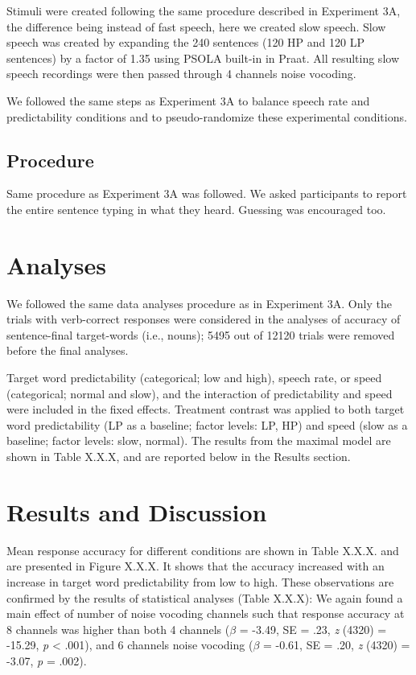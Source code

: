 \documentclass[a4paper, nobind]{templates/ociamthesis}
\begin{document}
Stimuli were created following the same procedure described in Experiment 3A, the difference being instead of fast speech, here we created slow speech.
Slow speech was created by expanding the 240 sentences (120 HP and 120 LP sentences) by a factor of 1.35 using PSOLA built-in in Praat.
All resulting slow speech recordings were then passed through 4 channels noise vocoding.

We followed the same steps as Experiment 3A to balance speech rate and predictability conditions and to pseudo-randomize these experimental conditions.

\hypertarget{procedure-4}{%
\subsection{Procedure}\label{procedure-4}}

Same procedure as Experiment 3A was followed.
We asked participants to report the entire sentence typing in what they heard.
Guessing was encouraged too.

\hypertarget{analyses-4}{%
\section{Analyses}\label{analyses-4}}

We followed the same data analyses procedure as in Experiment 3A.
Only the trials with verb-correct responses were considered in the analyses of accuracy of sentence-final target-words (i.e., nouns); 5495 out of 12120 trials were removed before the final analyses.

Target word predictability (categorical; low and high), speech rate, or speed (categorical; normal and slow), and the interaction of predictability and speed were included in the fixed effects.
Treatment contrast was applied to both target word predictability (LP as a baseline; factor levels: LP, HP) and speed (slow as a baseline; factor levels: slow, normal).
The results from the maximal model are shown in Table X.X.X, and are reported below in the Results section.

\hypertarget{results-and-discussion-3}{%
\section{Results and Discussion}\label{results-and-discussion-3}}

Mean response accuracy for different conditions are shown in Table X.X.X. and are presented in Figure X.X.X.
It shows that the accuracy increased with an increase in target word predictability from low to high.
These observations are confirmed by the results of statistical analyses (Table X.X.X):
We again found a main effect of number of noise vocoding channels such that response accuracy at 8 channels was higher than both 4 channels (\(\beta\) = -3.49, SE = .23, \emph{z} (4320) = -15.29, \emph{p} \textless{} .001), and 6 channels noise vocoding (\(\beta\) = -0.61, SE = .20, \emph{z} (4320) = -3.07, \emph{p} = .002).
\end{document}

